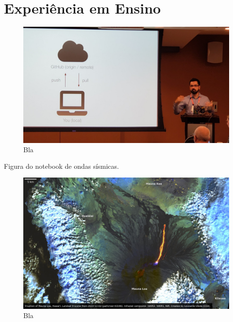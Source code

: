 \documentclass[11pt,a4paper,oneside]{book}
\begin{document}
\chapter{Experiência em Ensino}

\begin{figure}[h]
  \vspace{0.5cm}
  \begin{center}
    \includegraphics[width=\textwidth]{images/agu-2019-git-lesson.jpg}
  \end{center}
  \caption{
    Bla
  }
\end{figure}

Figura do notebook de ondas sísmicas.

\begin{figure}[h]
  \vspace{0.5cm}
  \begin{center}
    \includegraphics[width=\textwidth]{images/mauna-loa-landsat-2022-12-02.jpg}
  \end{center}
  \caption{
    Bla
  }
\end{figure}
\end{document}
